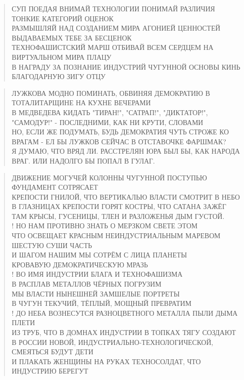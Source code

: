 \poemtitle{***}
\begin{verse}
СУП ПОЕДАЯ ВНИМАЙ ТЕХНОЛОГИИ ПОНИМАЙ РАЗЛИЧИЯ ТОНКИЕ КАТЕГОРИЙ ОЦЕНОК\\
РАЗМЫШЛЯЙ НАД СОЗДАНИЕМ МИРА АГОНИЕЙ ЦЕННОСТЕЙ ВЫДАВАЕМЫХ ТЕБЕ ЗА БЕСЦЕНОК\\
ТЕХНОФАШИСТСКИЙ МАРШ ОТБИВАЙ ВСЕМ СЕРДЦЕМ НА ВИРТУАЛЬНОМ МИРА ПЛАЦУ\\
В НАГРАДУ ЗА ПОЗНАНИЕ ИНДУСТРИЙ ЧУГУННОЙ ОСНОВЫ КИНЬ БЛАГОДАРНУЮ ЗИГУ ОТЦУ
\end{verse}

\poemtitle{***}
\begin{verse}
ЛУЖКОВА МОДНО ПОМИНАТЬ, ОБВИНЯЯ ДЕМОКРАТИЮ В ТОТАЛИТАРЩИНЕ НА КУХНЕ ВЕЧЕРАМИ\\
В МЕДВЕДЕВА КИДАТЬ "ТИРАН!", "САТРАП!", "ДИКТАТОР!", "САМОДУР!" - ПОСЛЕДНИМИ, КАК НИ КРУТИ, СЛОВАМИ \\
НО, ЕСЛИ ЖЕ ПОДУМАТЬ, БУДЬ ДЕМОКРАТИЯ ЧУТЬ СТРОЖЕ КО ВРАГАМ - ЕЛ БЫ ЛУЖКОВ СЕЙЧАС В ОТСТАВОЧКЕ ФАРШМАК?\\
Я ДУМАЮ, ЧТО ВРЯД ЛИ. РАССТРЕЛЯН ЮРА БЫЛ БЫ, КАК НАРОДА ВРАГ. ИЛИ НАДОЛГО БЫ ПОПАЛ В ГУЛАГ.
\end{verse}

\poemtitle{***}
\begin{verse}
ДВИЖЕНИЕ МОГУЧЕЙ КОЛОННЫ ЧУГУННОЙ ПОСТУПЬЮ ФУНДАМЕНТ СОТРЯСАЕТ\\
КРЕПОСТИ ГНИЛОЙ, ЧТО ВЕРТИКАЛЬЮ ВЛАСТИ СМОТРИТ В НЕБО\\
В ГЛАЗНИЦАХ КРЕПОСТИ ГОРЯТ КОСТРЫ, ЧТО САТАНА ЗАЖЁГ\\
ТАМ КРЫСЫ, ГУСЕНИЦЫ, ТЛЕН И РАЗЛОЖЕНЬЯ ДЫМ ГУСТОЙ.\\!
НО НАМ ПРОТИВНО ЗНАТЬ О МЕРЗКОМ СВЕТЕ ЭТОМ\\
ЧТО ОСВЕЩАЕТ КРАСНЫМ НЕИНДУСТРИАЛЬНЫМ МАРЕВОМ ШЕСТУЮ СУШИ ЧАСТЬ\\
И ШАГОМ НАШИМ МЫ СОТРЁМ С ЛИЦА ПЛАНЕТЫ\\
КРОВАВУЮ ДЕМОКРАТИЧЕСКУЮ МРАЗЬ\\!
ВО ИМЯ ИНДУСТРИИ БЛАГА И ТЕХНОФАШИЗМА\\
В РАСПЛАВ МЕТАЛЛОВ ЧЁРНЫХ ПОГРУЗИМ\\
МЫ ВЛАСТИ НЫНЕШНЕЙ ЗАМШЕЛЫЕ ПОРТРЕТЫ\\
В ЧУГУН ТЕКУЧИЙ, ТЁПЛЫЙ, МОЩНЫЙ ПРЕВРАТИМ\\!
ДО НЕБА ВОЗНЕСУТСЯ РАЗНОЦВЕТНОГО МЕТАЛЛА ПЫЛИ ДЫМА ПЛЕТИ\\
ИЗ ТРУБ, ЧТО В ДОМНАХ ИНДУСТРИИ В ТОПКАХ ТЯГУ СОЗДАЮТ\\
В РОССИИ НОВОЙ, ИНДУСТРИАЛЬНО-ТЕХНОЛОГИЧЕСКОЙ, СМЕЯТЬСЯ БУДУТ ДЕТИ\\
И ПЛАКАТЬ ЖЕНЩИНЫ НА РУКАХ ТЕХНОСОЛДАТ, ЧТО ИНДУСТРИЮ БЕРЕГУТ
\end{verse}

